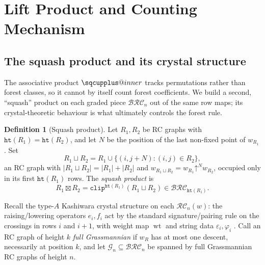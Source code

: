 \documentclass{amsart}
\makeatletter
\theoremstyle{definition}
\newtheorem{definition}[theorem]{Definition}
\theoremstyle{remark}
\newcommand{\BRC}{\mathcal{BRC}}
\newcommand{\RC}{\mathcal{RC}}
\newcommand{\grass}{\mathcal{G}}
\newcommand{\shup}{\mathord{\uparrow}}
\newcommand{\wtt}{\operatorname{wt}}
\newcommand{\wof}[1]{w_{#1}}
\newcommand{\hr}{\mathtt{ht}}
\newcommand{\clp}{\mathtt{clip}}
\newcommand{\sqcupplus@inner}[2]{%
  \vcenter{\hbox{\ooalign{%
    \hfil$\m@th#1\sqcup$\hfil\cr
    \hfil\raisebox{0.15ex}{$\m@th#1\scriptscriptstyle+$}\hfil\cr
  }}}%
}
\newcommand{\sqcupplus}{\mathbin{\mathpalette\sqcupplus@inner\relax}}
\makeatother
\begin{document}
\section{Lift Product and Counting Mechanism}

\subsection{The squash product and its crystal structure}\label{section:squash}

The associative product $\sqcupplus$ tracks permutations rather than forest classes, so it cannot by itself count forest coefficients. We build a second, ``squash'' product on each graded piece $\BRC_n$ out of the same row maps; its crystal-theoretic behaviour is what ultimately controls the forest rule.

\begin{definition}[Squash product]\label{definition:squash}
Let $R_1,R_2$ be RC graphs with $\hr(R_1)=\hr(R_2)$, and let $N$ be the position of the last non-fixed point of $\wof{R_1}$. Set
\[
R_1\sqcup R_2=R_1\cup\{(i,j+N):(i,j)\in R_2\},
\]
an RC graph with $|R_1\sqcup R_2|=|R_1|+|R_2|$ and $\wof{R_1\sqcup R_2}=\wof{R_1}\shup^N\wof{R_2}$, occupied only in its first $\hr(R_1)$ rows. The \emph{squash product} is
\[
R_1\boxtimes R_2=\clp^{\hr(R_1)}(R_1\sqcup R_2)\in\BRC_{\hr(R_1)}.
\]
\end{definition}

Recall the type-$A$ Kashiwara crystal structure on each $\RC_n(w)$: the raising/lowering operators $e_i,f_i$ act by the standard signature/pairing rule on the crossings in rows $i$ and $i+1$, with weight map $\wtt$ and string data $\varepsilon_i,\varphi_i$ \cite{assaf2018demazure,morse2016crystal}. Call an RC graph of height $k$ \emph{full Grassmannian} if $\wof{R}$ has at most one descent, necessarily at position $k$, and let $\grass_n\subseteq\BRC_n$ be spanned by full Grassmannian RC graphs of height $n$.
\end{document}
